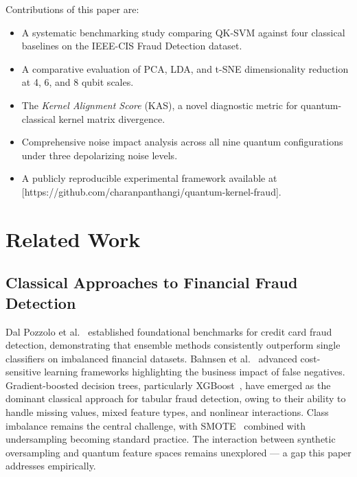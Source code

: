 \documentclass[journal]{IEEEtran}
\begin{document}
Contributions of this paper are:
\begin{itemize}
    \item A systematic benchmarking study comparing QK-SVM against 
    four classical baselines on the IEEE-CIS Fraud Detection dataset.
    \item A comparative evaluation of PCA, LDA, and t-SNE 
    dimensionality reduction at 4, 6, and 8 qubit scales.
    \item The \textit{Kernel Alignment Score} (KAS), a novel 
    diagnostic metric for quantum-classical kernel matrix divergence.
    \item Comprehensive noise impact analysis across all nine 
    quantum configurations under three depolarizing noise levels.
    \item A publicly reproducible experimental framework 
    available at [https://github.com/charanpanthangi/quantum-kernel-fraud].
\end{itemize}

\section{Related Work}
\label{sec:literature}

\subsection{Classical Approaches to Financial Fraud Detection}
Dal Pozzolo et al.~\cite{dalpozzolo2015} established foundational 
benchmarks for credit card fraud detection, demonstrating that 
ensemble methods consistently outperform single classifiers on 
imbalanced financial datasets. Bahnsen et al.~\cite{bahnsen2016} 
advanced cost-sensitive learning frameworks highlighting the 
business impact of false negatives. Gradient-boosted decision 
trees, particularly XGBoost~\cite{chen2016xgboost}, have emerged 
as the dominant classical approach for tabular fraud detection, 
owing to their ability to handle missing values, mixed feature 
types, and nonlinear interactions. Class imbalance remains the 
central challenge, with SMOTE~\cite{chawla2002smote} combined 
with undersampling becoming standard practice. The interaction 
between synthetic oversampling and quantum feature spaces remains 
unexplored --- a gap this paper addresses empirically.
\end{document}
